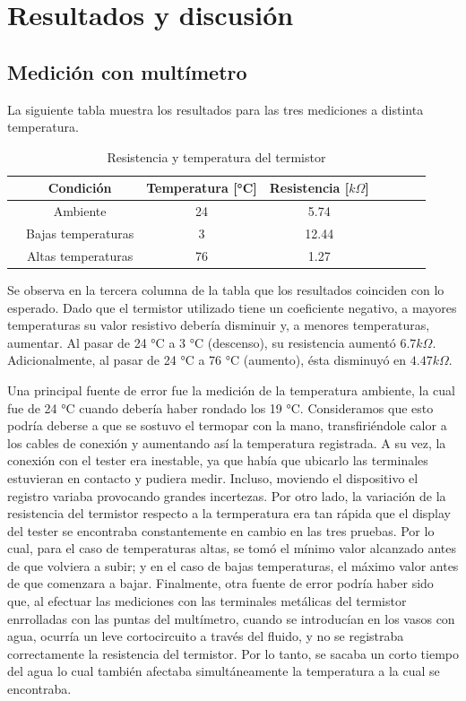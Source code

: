 \section{Resultados y discusión}

\subsection{Medición con multímetro}

La siguiente tabla muestra los resultados para las tres mediciones a distinta temperatura.
\begin{table}[H]
    \centering
    \footnotesize
    \caption{Resistencia y temperatura del termistor}
    \begin{tabular}{lccccccc}
    \toprule
    & Condición & Temperatura [°C] & Resistencia [$ k\Omega$] \\
    \midrule
        & Ambiente & 24 & 5.74  \\
        & Bajas temperaturas & 3 & 12.44  \\
        & Altas temperaturas & 76 & 1.27 \\
    \bottomrule
    \end{tabular}
    \end{table}
    \vspace{-0.5cm}
    Se observa en la tercera columna de la tabla que los resultados coinciden con lo esperado. Dado que el termistor utilizado tiene un coeficiente negativo, a mayores temperaturas su valor resistivo debería disminuir y, a menores temperaturas, aumentar.
    Al pasar de 24 °C a 3 °C (descenso), su resistencia aumentó $ 6.7  k\Omega$. Adicionalmente, al pasar de 24 °C a 76 °C (aumento), ésta disminuyó en $ 4.47  k\Omega$.
    
    Una principal fuente de error fue la medición de la temperatura ambiente, la cual fue de 24 °C cuando debería haber rondado los 19 °C. Consideramos que esto podría deberse a que se sostuvo el termopar con la mano, transfiriéndole calor a los cables de conexión y aumentando así la temperatura registrada. A su vez, la conexión con 
    el tester era inestable, ya que había que ubicarlo las terminales estuvieran en contacto y pudiera medir. Incluso, moviendo el dispositivo el registro variaba provocando grandes incertezas. Por otro lado,
    la variación de la resistencia del termistor respecto a la termperatura era tan rápida que el display del tester se encontraba constantemente en cambio en las tres pruebas. Por lo cual, para el caso de temperaturas altas, se tomó el mínimo valor alcanzado antes de que 
    volviera a subir; y en el caso de bajas temperaturas, el máximo valor antes de que comenzara a bajar. Finalmente, otra fuente de error podría haber sido que, al efectuar las mediciones con las terminales metálicas del termistor enrrolladas con las puntas del multímetro, cuando se introducían en los vasos con agua, ocurría un 
    leve cortocircuito a través del fluido, y no se registraba correctamente la resistencia del termistor. Por lo tanto, se sacaba un corto tiempo del agua lo cual también afectaba simultáneamente la temperatura a la cual se encontraba.


